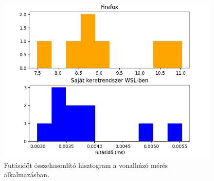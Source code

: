 \begin{figure}[h!]
    \centering
    \includegraphics[width=14truecm]{images/histogram_compare_gradient.png}
    \caption{Futásidőt összehasonlító hisztogram a vonalhúzó mérés alkalmazásban.}
    \label{fig:hist-compare-gradient}
\end{figure}